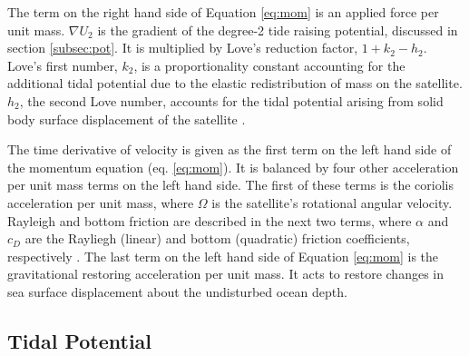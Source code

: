 The term on the right hand side of Equation \ref{eq:mom} is an applied force per unit mass. $\nabla U_2$ is the gradient of the degree-2 tide raising potential, discussed in section \ref{subsec:pot}. It is multiplied by Love's reduction factor, $1 + k_2 - h_2$. Love's first number, $k_2$, is a proportionality constant accounting for the additional tidal potential due to the elastic redistribution of mass on the satellite. $h_2$, the second Love number, accounts for the tidal potential arising from solid body surface displacement of the satellite \citep{love1911some}.

The time derivative of velocity is given as the first term on the left hand side of the momentum equation (eq. \ref{eq:mom}). It is balanced by four other acceleration per unit mass terms on the left hand side. The first of these terms is the coriolis acceleration per unit mass, where $\Omega$ is the satellite's rotational angular velocity. Rayleigh and bottom friction are described in the next two terms, where $\alpha$ and $c_D$ are the Rayliegh (linear) and bottom (quadratic) friction coefficients, respectively \citep{sears1995tidal,chen2013tidal}. The last term on the left hand side of Equation \ref{eq:mom} is the gravitational restoring acceleration per unit mass. It acts to restore changes in sea surface displacement about the undisturbed ocean depth.

\subsection{Tidal Potential \label{subsec:pot}}

